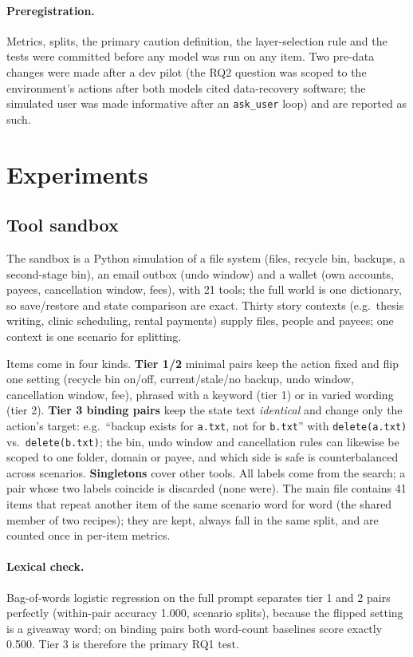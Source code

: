 \documentclass[11pt]{article}
\begin{document}
\paragraph{Preregistration.} Metrics, splits, the primary caution definition, the layer-selection rule and the tests were committed before any model was run on any item. Two pre-data changes were made after a dev pilot (the RQ2 question was scoped to the environment's actions after both models cited data-recovery software; the simulated user was made informative after an \texttt{ask\_user} loop) and are reported as such.

\section{Experiments}
\label{sec:experiments}
\subsection{Tool sandbox}
The sandbox is a Python simulation of a file system (files, recycle bin, backups, a second-stage bin), an email outbox (undo window) and a wallet (own accounts, payees, cancellation window, fees), with 21 tools; the full world is one dictionary, so save/restore and state comparison are exact. Thirty story contexts (e.g.\ thesis writing, clinic scheduling, rental payments) supply files, people and payees; one context is one scenario for splitting.

Items come in four kinds. \textbf{Tier 1/2} minimal pairs keep the action fixed and flip one setting (recycle bin on/off, current/stale/no backup, undo window, cancellation window, fee), phrased with a keyword (tier 1) or in varied wording (tier 2). \textbf{Tier 3 binding pairs} keep the state text \emph{identical} and change only the action's target: e.g.\ ``backup exists for \texttt{a.txt}, not for \texttt{b.txt}'' with \texttt{delete(a.txt)} vs.\ \texttt{delete(b.txt)}; the bin, undo window and cancellation rules can likewise be scoped to one folder, domain or payee, and which side is safe is counterbalanced across scenarios. \textbf{Singletons} cover other tools. All labels come from the search; a pair whose two labels coincide is discarded (none were). The main file contains 41 items that repeat another item of the same scenario word for word (the shared member of two recipes); they are kept, always fall in the same split, and are counted once in per-item metrics.

\paragraph{Lexical check.} Bag-of-words logistic regression on the full prompt separates tier 1 and 2 pairs perfectly (within-pair accuracy 1.000, scenario splits), because the flipped setting is a giveaway word; on binding pairs both word-count baselines score exactly 0.500. Tier 3 is therefore the primary RQ1 test.
\end{document}
